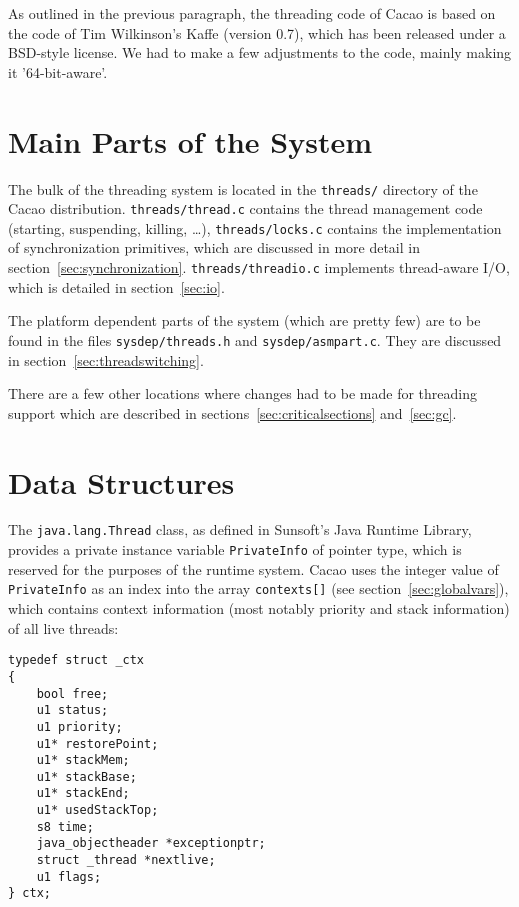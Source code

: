 \documentclass[twocolumn,a4paper]{article}      %
\begin{document}
As outlined in the previous paragraph, the threading code of Cacao is
based on the code of Tim Wilkinson's Kaffe (version 0.7), which has
been released under a BSD-style license.  We had to make a few
adjustments to the code, mainly making it '64-bit-aware'.

\section{Main Parts of the System}
\label{sec:mainparts}

The bulk of the threading system is located in the \texttt{threads/}
directory of the Cacao distribution. \texttt{threads/thread.c}
contains the thread management code (starting, suspending, killing,
\dots ), \texttt{threads/locks.c} contains the implementation of
synchronization primitives, which are discussed in more detail in
section~\ref{sec:synchronization}.
\texttt{threads/threadio.c} implements thread-aware I/O, which is detailed in
section~\ref{sec:io}.

The platform dependent parts of the system (which are pretty few) are
to be found in the files \texttt{sysdep/threads.h} and
\texttt{sysdep/asmpart.c}. They are discussed in
section~\ref{sec:threadswitching}.

There are a few other locations where changes had to be made for
threading support which are described in
sections~\ref{sec:criticalsections} and~\ref{sec:gc}.

\section{Data Structures}
\label{sec:datastructures}

The \texttt{java.lang.Thread} class, as defined in Sunsoft's Java
Runtime Library, provides a private instance variable
\texttt{PrivateInfo} of pointer type, which is reserved for the
purposes of the runtime system. Cacao uses the integer value of
\texttt{PrivateInfo} as an index into the array \texttt{contexts[]}
(see section~\ref{sec:globalvars}), which contains context information
(most notably priority and stack information) of all live threads:

\begin{verbatim}
typedef struct _ctx
{
    bool free;
    u1 status;
    u1 priority;
    u1* restorePoint;
    u1* stackMem;
    u1* stackBase;
    u1* stackEnd;
    u1* usedStackTop;
    s8 time;
    java_objectheader *exceptionptr;
    struct _thread *nextlive;
    u1 flags;
} ctx;
\end{verbatim}
\end{document}
